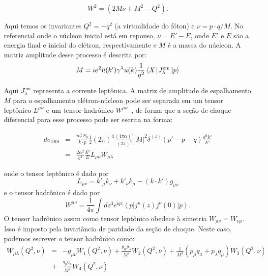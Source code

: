 \begin{equation}
    W^2 = (2M\nu + M^2 - Q^2).
\end{equation}

Aqui temos os invariantes \( Q^2 = -q^2 \) (a virtualidade do fóton) e \( \nu = p \cdot q /M\). No referencial onde o núcleon inicial está em repouso, \( \nu = E' - E \), onde \( E' \) e \( E \) são a energia final e inicial do elétron, respectivamente  e \( M \) é a massa do núcleon.  A matriz amplitude desse processo é descrita por:
\begin{equation}
    M = ie^2 \bar{u}(k')\gamma^\lambda u(k) \frac{1}{q^2}\bra{X}J_\lambda^{\text{em}}\ket{p}
\end{equation}

Aqui \( J_\lambda^\text{em}\) representa a corrente leptônica. A matriz de amplitude de espalhamento  \( M\) para o espalhamento elétron-núcleon pode ser separada em um tensor leptônico \( L^{\mu\nu} \) e um tensor hadrônico \( W^{\mu\nu} \)~\cite{griffiths_introduction_2008}, de forma que a seção de choque diferencial para esse processo  pode ser escrita na forma:

\begin{eqnarray}
    d\sigma_{\text{DIS}}& =& \frac{m_e^2 E_p}{k\cdot p}\frac{1}{2} (2\pi)^4 \frac{(4\pi \alpha)^2}{(2\pi)^3}|M|^2 \delta^{(4)}(p'-p-q)\frac{d^3k'}{E'}\nonumber\\
    &=& \frac{2\alpha^2}{q^4}\frac{E'}{E}L_{\mu\nu} W_{\mu\lambda}
    \label{eq:secaoWL}
\end{eqnarray}

onde o tensor  leptônico é dado por
\begin{equation}
    L_{\mu\nu} = k'_\mu k_\nu + k'_\nu k_\mu - (k\cdot k')g_{\mu\nu}
\end{equation}
e o tensor hadrônico é dado por
\begin{equation}
    W^{\mu\nu} = \frac{1}{4\pi} \int dz^4 e^{iqz} \left\langle p \right| j^\mu(z)j^\nu(0) \left| p \right\rangle. \tag{1.13}
\end{equation}
O tensor hadrônico assim como tensor leptônico obedece à simetria $W_{\mu\nu} = W_{\nu\mu}$. Isso é imposto pela invariância de paridade  da seção de choque. Neste caso, podemos escrever o tensor hadrônico como:
\begin{eqnarray}
    W_{\mu\lambda}(Q^2, \nu)&= & -g_{\mu\nu} W_1(Q^2, \nu) + \frac{p_\mu p_\lambda}{M^2} W_ 2(Q^2, \nu) + \frac{1}{M^2}(p_\mu q_\lambda +  p_\lambda q_\mu)W_3 (Q^2, \nu)\nonumber\\
    &+& \frac{q_\mu q_\lambda}{M^2} W_4(Q^2, \nu)
    \label{eq:Wmunu}
\end{eqnarray}

